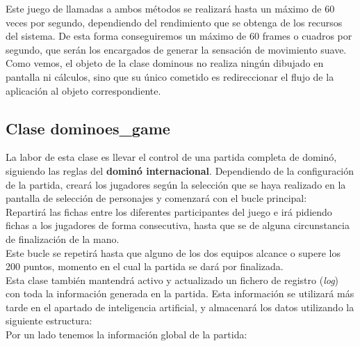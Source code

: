 Este juego de llamadas a ambos métodos se realizará hasta un máximo de 60 veces por segundo, dependiendo del rendimiento
que se obtenga de los recursos del sistema. De esta forma conseguiremos un máximo de 60 frames o cuadros por segundo,
que serán los encargados de generar la sensación de movimiento suave. \\

Como vemos, el objeto de la clase dominous no realiza ningún dibujado en pantalla ni cálculos, sino que su único
cometido es redireccionar el flujo de la aplicación al objeto correspondiente.

\subsection{Clase dominoes\_game}

La labor de esta clase es llevar el control de una partida completa de dominó, siguiendo las reglas del \textbf{dominó
internacional}. Dependiendo de la configuración de la partida, creará los jugadores según la selección que se haya
realizado en la pantalla de selección de personajes y comenzará con el bucle principal: \\

Repartirá las fichas entre los diferentes participantes del juego e irá pidiendo fichas a los jugadores de forma
consecutiva, hasta que se de alguna circunstancia de finalización de la mano. \\

Este bucle se repetirá hasta que alguno de los dos equipos alcance o supere los 200 puntos, momento en el cual la partida
se dará por finalizada. \\

Esta clase también mantendrá activo y actualizado un fichero de registro (\emph{log}) con toda la información generada en la partida. Esta
información se utilizará más tarde en el apartado de inteligencia artificial, y almacenará los datos utilizando
la siguiente estructura: \\

Por un lado tenemos la información global de la partida: 

